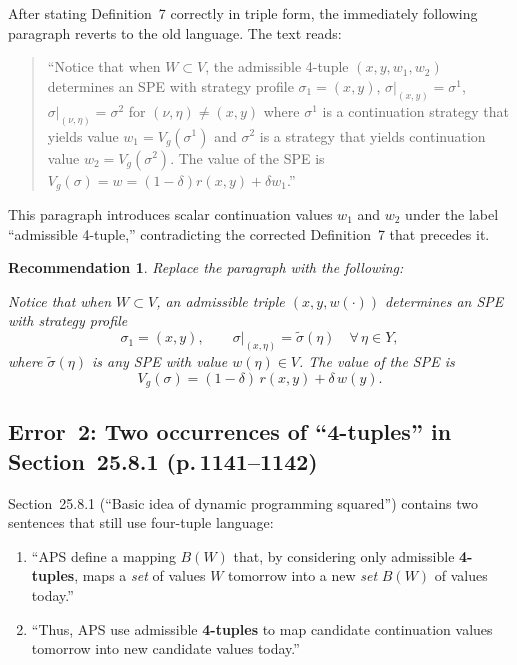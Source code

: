 \documentclass[12pt]{article}
\newtheorem{recommendation}{Recommendation}
\begin{document}
After stating Definition~7 correctly in triple form, the immediately
following paragraph reverts to the old language.  The text reads:

\begin{quote}
``Notice that when $W\subset V$, the admissible 4-tuple
$(x,y,w_1,w_2)$ determines an SPE with strategy profile
$\sigma_1=(x,y)$, $\sigma|_{(x,y)}=\sigma^1$,
$\sigma|_{(\nu,\eta)}=\sigma^2$ for $(\nu,\eta)\neq(x,y)$
where $\sigma^1$ is a continuation strategy that yields value
$w_1=V_g(\sigma^1)$ and $\sigma^2$ is a strategy that yields
continuation value $w_2=V_g(\sigma^2)$.  The value of the SPE is
$V_g(\sigma)=w=(1-\delta)r(x,y)+\delta w_1$.''
\end{quote}

This paragraph introduces scalar continuation values $w_1$ and $w_2$
under the label ``admissible 4-tuple,'' contradicting the corrected
Definition~7 that precedes it.

\begin{recommendation}
Replace the paragraph with the following:

\smallskip
\noindent
Notice that when $W\subset V$, an admissible triple $(x,y,w(\cdot))$
determines an SPE with strategy profile
\[
  \sigma_1 = (x,y), \qquad
  \sigma|_{(x,\eta)} = \tilde\sigma(\eta) \quad \forall\,\eta\in Y,
\]
where $\tilde\sigma(\eta)$ is any SPE with value $w(\eta)\in V$.  The
value of the SPE is
\[
  V_g(\sigma) = (1-\delta)\,r(x,y)+\delta\,w(y).
\]
\end{recommendation}

\subsection{Error~2: Two occurrences of ``4-tuples'' in Section~25.8.1
(p.\,1141--1142)}

Section~25.8.1 (``Basic idea of dynamic programming squared'') contains
two sentences that still use four-tuple language:

\begin{enumerate}
\item ``APS define a mapping $B(W)$ that, by considering only admissible
      \textbf{4-tuples}, maps a \emph{set} of values $W$ tomorrow into a
      new \emph{set} $B(W)$ of values today.''
\item ``Thus, APS use admissible \textbf{4-tuples} to map candidate
      continuation values tomorrow into new candidate values today.''
\end{enumerate}
\end{document}
